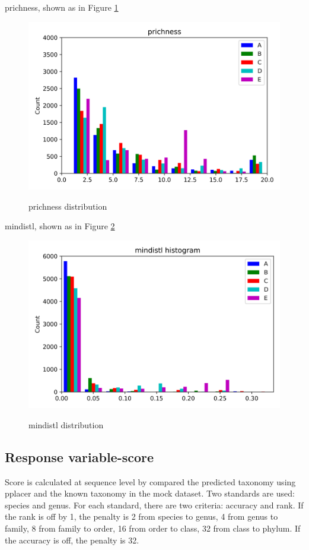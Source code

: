 \documentclass{article}
\begin{document}
prichness, shown as in Figure \ref{prichness} \par
\begin{figure}[H]
	\centering
	\includegraphics[width=\textwidth, keepaspectratio]{prichness.png}\\
	\caption{prichness distribution}
	\label{prichness}
\end{figure}


mindistl, shown as in Figure \ref{mindistl}
\begin{figure}[H]
	\centering
	\includegraphics[width=\textwidth, keepaspectratio]{mindistl.png}\\
	\caption{mindistl distribution}
	\label{mindistl}
\end{figure}
\subsection{Response variable-score}
Score is calculated at sequence level by compared the predicted taxonomy using pplacer and the known taxonomy in the mock dataset. Two standards are used: species and genus. For each standard, there are two criteria: accuracy and rank.  If the rank is off by 1, the penalty is 2 from species to genus, 4 from genus to family, 8 from family to order, 16 from order to class, 32 from class to phylum.  If the accuracy is off, the penalty is 32.
\end{document}
